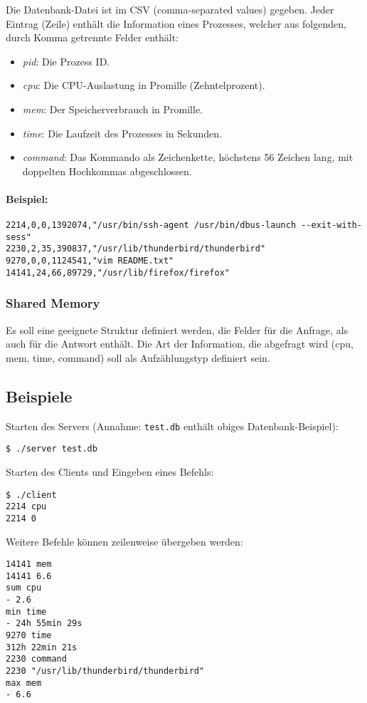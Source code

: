 Die Datenbank-Datei ist im CSV (comma-separated values) gegeben.
Jeder Eintrag (Zeile) enthält die Information eines Prozesses, welcher
aus folgenden, durch Komma getrennte Felder enthält:

\begin{itemize}
  \item \emph{pid}: Die Prozess ID.
  \item \emph{cpu}: Die CPU-Auslastung in Promille (Zehntelprozent).
  \item \emph{mem}: Der Speicherverbrauch in Promille.
  \item \emph{time}: Die Laufzeit des Prozesses in Sekunden.
  \item \emph{command}: Das Kommando als Zeichenkette, höchstens 56
    Zeichen lang, mit doppelten Hochkommas abgeschlossen.
\end{itemize}

\paragraph{Beispiel:}

\begin{verbatim}
2214,0,0,1392074,"/usr/bin/ssh-agent /usr/bin/dbus-launch --exit-with-sess"
2230,2,35,390837,"/usr/lib/thunderbird/thunderbird"
9270,0,0,1124541,"vim README.txt"
14141,24,66,89729,"/usr/lib/firefox/firefox"
\end{verbatim}



\subsubsection*{Shared Memory}

Es soll eine geeignete Struktur definiert werden, die Felder für die Anfrage,
als auch für die Antwort enthält. Die Art der Information, die abgefragt wird
(cpu, mem, time, command) soll als Aufzählungstyp definiert sein.


\subsection*{Beispiele}

Starten des Servers (Annahme: \texttt{test.db} enthält obiges
Datenbank-Beispiel):
%
\begin{verbatim}
$ ./server test.db
\end{verbatim}
%
Starten des Clients und Eingeben eines Befehls:
%
\begin{verbatim}
$ ./client
2214 cpu
2214 0
\end{verbatim}
%
Weitere Befehle können zeilenweise übergeben werden:
%
\begin{verbatim}
14141 mem
14141 6.6
sum cpu
- 2.6
min time
- 24h 55min 29s
9270 time
312h 22min 21s
2230 command
2230 "/usr/lib/thunderbird/thunderbird"
max mem
- 6.6
\end{verbatim}

\osueguidelinesthree


